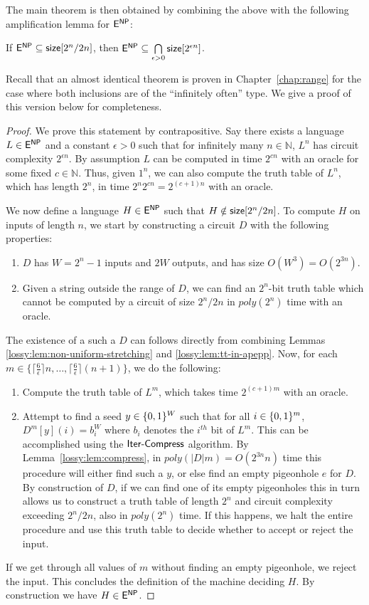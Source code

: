 The main theorem is then obtained by combining the above with the following amplification lemma for $\cl{E}^\cl{NP}$:
\begin{lemma}
If $\cl{E}^\cl{NP} \subseteq \cl{size}[2^n/2n]$, then $\cl{E}^\cl{NP} \subseteq \bigcap\limits_{\epsilon>0}\cl{size}[2^{\epsilon n}]$.
\end{lemma}
Recall that an almost identical theorem is proven in Chapter~\ref{chap:range} for the case where both inclusions are of the ``infinitely often'' type. We give a proof of this version below for completeness.
\begin{proof}
We prove this statement by contrapositive. Say there exists a language $L \in \cl{E}^\cl{NP}$ and a constant $\epsilon > 0$ such that for infinitely many $n \in \mathbb{N}$, $L^n$ has circuit complexity $2^{\epsilon n}$. By assumption $L$ can be computed in time $2^{cn}$ with an  oracle for some fixed $c \in \mathbb{N}$. Thus, given $1^n$, we can also compute the truth table of $L^n$, which has length $2^n$, in time $2^n2^{cn} = 2^{(c+1)n}$ with an  oracle. 

We now define a language $H \in \cl{E}^\cl{NP}$ such that $H \notin \cl{size}[2^n/2n]$. To compute $H$ on inputs of length $n$, we start by constructing a circuit $D$ with the following properties:
\begin{enumerate}
    \item $D$ has $W = 2^n - 1$ inputs and $2W$ outputs, and has size $O(W^3) = O(2^{3n})$.
    \item Given a string outside the range of $D$, we can find an $2^n$-bit truth table which cannot be computed by a circuit of size $2^n/2n$ in $poly(2^n)$ time with an  oracle.
\end{enumerate}
The existence of a such a $D$ can follows directly from combining Lemmas \ref{lossy:lem:non-uniform-stretching} and \ref{lossy:lem:tt-in-apepp}. Now, for each $m \in \{\lceil \frac{6}{\epsilon} \rceil n, \ldots, \lceil \frac{6}{\epsilon} \rceil (n+1)\}$, we do the following:
\begin{enumerate}
    \item Compute the truth table of $L^m$, which takes time $2^{(c+1)m}$ with an  oracle.
    \item Attempt to find a seed $y \in \{0,1\}^W$ such that for all $i \in \{0,1\}^m$, $D^m[y](i) = b_i^W$ where $b_i$ denotes the $i^{th}$ bit of $L^m$. This can be accomplished using the $\mathsf{Iter\text{-} Compress}$ algorithm. By Lemma~\ref{lossy:lem:compress}, in $poly(|D|m) = O(2^{3n}n)$ time this procedure will either find such a $y$, or else find an empty pigeonhole $e$ for $D$. By construction of $D$, if we can find one of its empty pigeonholes this in turn allows us to construct a truth table of length $2^n$ and circuit complexity exceeding $2^n/2n$, also in $poly(2^n)$ time. If this happens, we halt the entire procedure and use this truth table to decide whether to accept or reject the input.
\end{enumerate}
If we get through all values of $m$ without finding an empty pigeonhole, we reject the input. This concludes the definition of the machine deciding $H$. By construction we have $H \in \cl{E}^\cl{NP}$.


\end{proof}
